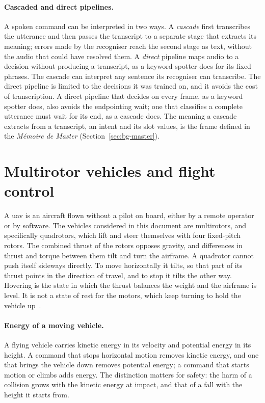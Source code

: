 \paragraph{Cascaded and direct pipelines.} A spoken command can be interpreted in two ways. A
\emph{cascade} first transcribes the utterance and then passes the transcript to a separate stage
that extracts its meaning; errors made by the recogniser reach the second stage as text, without the
audio that could have resolved them. A \emph{direct} pipeline maps audio to a decision without
producing a transcript, as a keyword spotter does for its fixed phrases. The cascade can interpret
any sentence its recogniser can transcribe. The direct pipeline is limited to the decisions it was
trained on, and it avoids the cost of transcription. A direct pipeline that decides on every frame,
as a keyword spotter does, also avoids the endpointing wait; one that classifies a complete
utterance must wait for its end, as a cascade does. The meaning a cascade extracts from a
transcript, an intent and its slot values, is the frame defined in the \emph{M\'emoire de Master}
(Section~\ref{sec:bg-master}).

\section{Multirotor vehicles and flight control}
\label{sec:bg-uav}
A \gls{uav} is an aircraft flown without a pilot on board, either by a remote operator or by
software. The vehicles considered in this document are multirotors, and specifically quadrotors,
which lift and steer themselves with four fixed-pitch rotors. The combined thrust of the rotors
opposes gravity, and differences in thrust and torque between them tilt and turn the airframe.
A quadrotor cannot push itself sideways directly. To move horizontally it tilts, so that part of
its thrust points in the direction of travel, and to stop it tilts the other way. Hovering is the
state in which the thrust balances the weight and the airframe is level. It is not a state of rest
for the motors, which keep turning to hold the vehicle up~\cite{mahony2012}.

\paragraph{Energy of a moving vehicle.} A flying vehicle carries kinetic energy in its velocity and
potential energy in its height. A command that stops horizontal motion removes kinetic energy, and
one that brings the vehicle down removes potential energy; a command that starts motion or climbs
adds energy. The distinction matters for safety: the harm of a collision grows with the kinetic
energy at impact, and that of a fall with the height it starts from.

